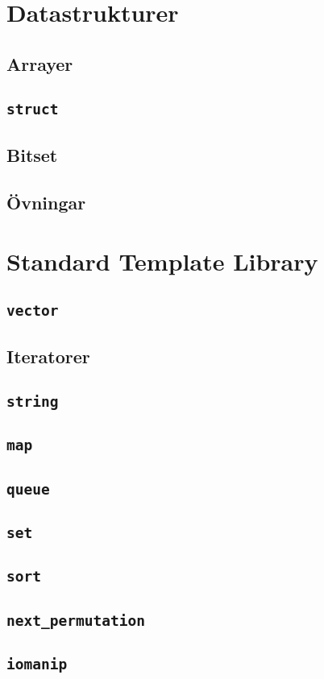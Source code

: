\documentclass[10pt,a4paper]{article}
\begin{document}
\section{Datastrukturer}
\subsection{Arrayer}

\subsection{\texttt{struct}}
\subsection{Bitset}
\subsection{Övningar}


\section{Standard Template Library}
\subsection{\texttt{vector}}
\subsection{Iteratorer}
\subsection{\texttt{string}}
\subsection{\texttt{map}}
\subsection{\texttt{queue}}
\subsection{\texttt{set}}
\subsection{\texttt{sort}}
\subsection{\texttt{next\_permutation}}
\subsection{\texttt{iomanip}}

\end{document}
